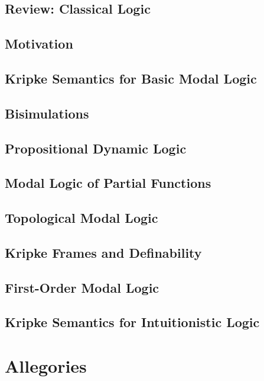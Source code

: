 \documentclass[11pt]{book}
\begin{document}
\section*{Review: Classical Logic}

\section{Motivation}

\section{Kripke Semantics for Basic Modal Logic}

\section{Bisimulations}

\section{Propositional Dynamic Logic}

\section{Modal Logic of Partial Functions}

\section{Topological Modal Logic}

\section{Kripke Frames and Definability}

\section{First-Order Modal Logic}

\section{Kripke Semantics for Intuitionistic Logic}


\chapter{Allegories}
\end{document}
